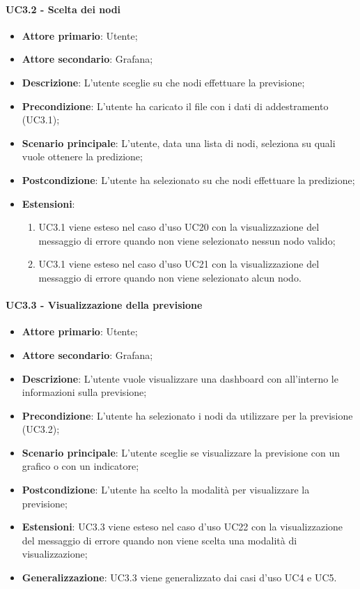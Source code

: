 \paragraph{UC3.2 - Scelta dei nodi}
\label{para:uc3.2}
\begin{itemize}
  \item \textbf{Attore primario}: Utente;
  \item \textbf{Attore secondario}: Grafana;
  \item \textbf{Descrizione}: L'utente sceglie su che nodi effettuare la previsione;
  \item \textbf{Precondizione}: L'utente ha caricato il file con i dati di addestramento (UC3.1);
  \item \textbf{Scenario principale}: L'utente, data una lista di nodi, seleziona su quali vuole ottenere la predizione;
  \item \textbf{Postcondizione}: L'utente ha selezionato su che nodi effettuare la predizione;
  \item \textbf{Estensioni}:
  \begin{enumerate}
    \item UC3.1 viene esteso nel caso d'uso UC20 con la visualizzazione del messaggio di errore quando non viene selezionato nessun nodo valido;
    \item UC3.1 viene esteso nel caso d'uso UC21 con la visualizzazione del messaggio di errore quando non viene selezionato alcun nodo.
    \end{enumerate}
\end{itemize}

\paragraph{UC3.3 - Visualizzazione della previsione}%
\label{para:uc3.3}
\begin{itemize}
  \item \textbf{Attore primario}: Utente;
  \item \textbf{Attore secondario}: Grafana;
  \item \textbf{Descrizione}: L'utente vuole visualizzare una dashboard con all'interno le informazioni sulla previsione;
  \item \textbf{Precondizione}: L'utente ha selezionato i nodi da utilizzare per la previsione (UC3.2);
  \item \textbf{Scenario principale}: L'utente sceglie se visualizzare la previsione con un grafico o con un indicatore;
  \item \textbf{Postcondizione}: L'utente ha scelto la modalità per visualizzare la previsione;
  \item \textbf{Estensioni}: UC3.3 viene esteso nel caso d'uso UC22 con la visualizzazione del messaggio di errore quando non viene scelta una modalità di visualizzazione;
  \item \textbf{Generalizzazione}: UC3.3 viene generalizzato dai casi d'uso UC4 e UC5.
\end{itemize}
